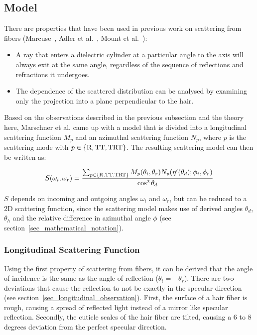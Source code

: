 \documentclass[11pt,a4paper]{report}
\begin{document}
\subsection{Model}

There are properties that have been used in previous work on scattering from fibers (Marcuse~\cite{marcuse1974}, Adler et al.~\cite{adler1998}, Mount et al.~\cite{mount1998}):

\begin{itemize}
\item A ray that enters a dielectric cylinder at a particular angle to the axis will always exit at the same angle, regardless of the sequence of reflections and refractions it undergoes.

\item The dependence of the scattered distribution can be analysed by examining only the projection into a plane perpendicular to the hair.
\end{itemize}

Based on the observations described in the previous subsection and the theory here, Marschner et al. came up with a model that is divided into a longitudinal scattering function $M_p$ and an azimuthal scattering function $N_p$, where $p$ is the scattering mode with $p \in \{\textnormal{R}, \textnormal{TT}, \textnormal{TRT}\}$. The resulting scattering model can then be written as:

\begin{equation}
\label{marschner_model_scatterfunction}
S(\omega_i, \omega_r) = \frac{\sum_{p \in \{\textnormal{R}, \textnormal{TT}, \textnormal{TRT}\}} M_p(\theta_i, \theta_r) N_p(\eta'(\theta_d); \phi_i, \phi_r)}{\cos^2 \theta_d}
\end{equation}

$S$ depends on incoming and outgoing angles $\omega_i$ and $\omega_r$, but can be reduced to a 2D scattering function, since the scattering model makes use of derived angles $\theta_d$, $\theta_h$ and the relative difference in azimuthal angle $\phi$ (see section~\ref{sec_mathematical_notation}).

\subsubsection{Longitudinal Scattering Function}
\label{marschner_longitudinal_scattering_function}

Using the first property of scattering from fibers, it can be derived that the angle of incidence is the same as the angle of reflection ($\theta_i = -\theta_r$). There are two deviations that cause the reflection to not be exactly in the specular direction (see section~\ref{sec_longitudinal_observation}). First, the surface of a hair fiber is rough, causing a spread of reflected light instead of a mirror like specular reflection. Secondly, the cuticle scales of the hair fiber are tilted, causing a 6 to 8 degrees deviation from the perfect specular direction.
\end{document}

